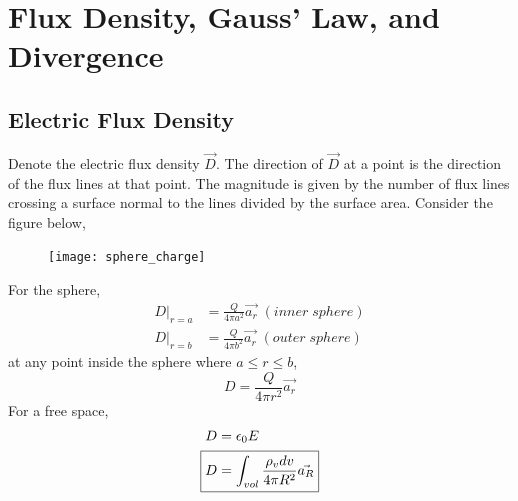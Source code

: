 \documentclass{article}
\begin{document}
\newpage 
\section{Flux Density, Gauss' Law, and Divergence}
\subsection{Electric Flux Density}
\noindent 
Denote the electric flux density $\vec{D}$. The direction of $\vec{D}$ at a point 
is the direction of the flux lines at that point. The magnitude is given by the number
of flux lines crossing a surface normal to the lines divided by the surface area. 
\vspace{8pt}
Consider the figure below,
\begin{figure}[H]
    \center
    \texttt{[image: sphere\_charge]}
\end{figure}
\noindent 
For the sphere, 
\begin{align*}
    D \Big|_{r=a} &= \frac{Q}{4\pi a^2}\vec{a_r} \; (inner \; sphere)\\
    D \Big|_{r=b} &= \frac{Q}{4\pi b^2}\vec{a_r} \; (outer \; sphere)
\end{align*}
at any point inside the sphere where $a\leq r \leq b$,
\begin{equation*}
D = \frac{Q}{4\pi r^2}\vec{a_r}
\end{equation*}
\noindent 
For a free space,
\begin{align*}
D &= \epsilon_0 E \\
\Aboxed{D &= \int_{vol} \frac{\rho_v dv}{4\pi R^2} \vec{a_R}}
\end{align*}
\end{document}
